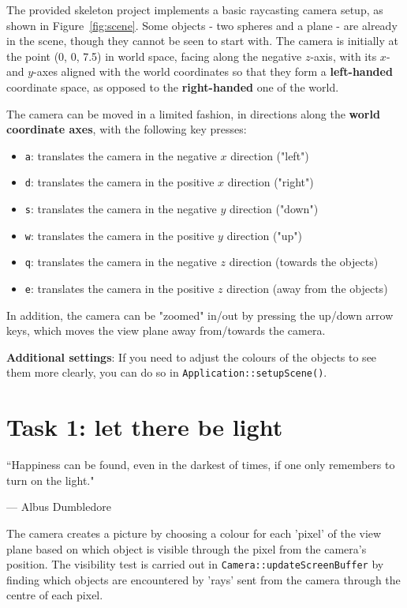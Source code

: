 \documentclass{../../../fal_assignment}
\begin{document}
The provided skeleton project implements a basic raycasting camera setup, as shown in Figure~\ref{fig:scene}.
Some objects - two spheres and a plane - are already in the scene, though they cannot be seen to start with. The camera is initially at the point (0, 0, 7.5) in world space, facing along the negative $z$-axis, with its $x$- and $y$-axes aligned with the world coordinates so that they form a \textbf{left-handed} coordinate space, as opposed to the \textbf{right-handed} one of the world.

The camera can be moved in a limited fashion, in directions along the \textbf{world coordinate axes}, with the following key presses:

\begin{itemize}
	\item \lstinline{a}: translates the camera in the negative $x$ direction ("left")
	\item \lstinline{d}: translates the camera in the positive $x$ direction ("right")
	\item \lstinline{s}: translates the camera in the negative $y$ direction ("down")
	\item \lstinline{w}: translates the camera in the positive $y$ direction ("up")
	\item \lstinline{q}:  translates the camera in the negative $z$ direction (towards the objects)
	\item \lstinline{e}:  translates the camera in the positive $z$ direction (away from the objects)
\end{itemize}

In addition, the camera can be "zoomed" in/out by pressing the up/down arrow keys, which moves the view plane away from/towards the camera.

\textbf{Additional settings}: If you need to adjust the colours of the objects to see them more clearly, you can do so in \lstinline{Application::setupScene()}.

\section*{Task 1: let there be light}
\begin{marginquote}
``Happiness can be found, even in the darkest of times, if one only remembers to turn on the light."
\par --- Albus Dumbledore
\end{marginquote}
The camera creates a picture by choosing a colour for each 'pixel' of the view plane based on which object is visible through the pixel from the camera's position. The visibility test is carried out in \lstinline{Camera::updateScreenBuffer} by finding which objects are encountered by 'rays' sent from the camera through the centre of each pixel.
\end{document}
